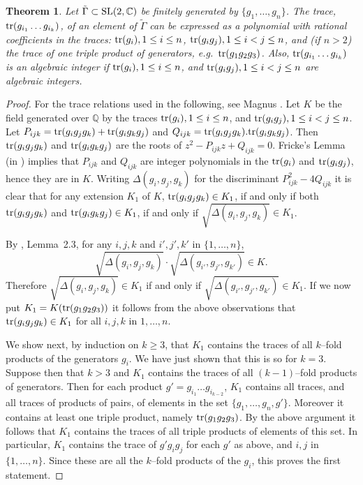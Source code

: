 \documentclass[a4paper]{amsart}
\def\Q{{\mathbb Q}}
\def\C{{\mathbb C}}
\def\sl2c{\mbox{\rm SL}(2,\C)}
\def\tr{\mbox{\rm tr}}
\def\Gammatil{\tilde{\Gamma}}
\newtheorem{theorem}{Theorem}[section]
\theoremstyle{definition}
\begin{document}
\begin{theorem} \label{genset}
Let $\Gammatil\subset\sl2c$ be finitely generated by $\{g_1,\ldots,g_n\}$.
The trace, $\tr(g_{i_1}\ldots g_{i_k})$, of an element of
$\Gammatil$ can be expressed as a
polynomial with rational coefficients in the traces: $\tr(g_i),
1\leq i \leq n$, $\tr(g_ig_j), 1\leq i < j\leq n$, and (if $n>2$) the
trace of one triple product of generators, e.g.\ $\tr(g_1g_2g_3)$.
Also, $\tr(g_{i_1}\ldots g_{i_k})$ is an algebraic integer if $\tr(g_i),
1\leq i \leq n$, and $\tr(g_ig_j), 1\leq i < j\leq n$ are algebraic integers. 
\end{theorem}

\begin{proof}
For the trace relations used in the following, see Magnus
\cite{magnus}. 
Let $K$ be the field generated over $\Q$ by the traces $\tr(g_i),
1\leq i \leq n$, and $\tr(g_ig_j), 1\leq i < j\leq n$. Let $P_{ijk} =
\tr(g_i g_j g_k) + \tr(g_i g_k g_j)$ and $Q_{ijk} = \tr(g_i g_j g_k) .
\tr(g_i g_k g_j)$. 
Then $\tr(g_i g_j g_k)$ and $\tr(g_i g_k g_j)$ are the roots of $z^2 -
P_{ijk} z + Q_{ijk} = 0$. 
Fricke's Lemma (in \cite{magnus}) implies that
$P_{ijk}$ and $Q_{ijk}$ are integer
polynomials in the $\tr(g_i)$ and $\tr(g_ig_j)$, hence
they are in $K$. 
Writing $\Delta(g_i,g_j,g_k)$ for the discriminant $P_{ijk}^2 - 4 Q_{ijk}$ it
is clear that for any extension $K_1$ of $K$,
$\tr(g_i g_j g_k) \in
K_1$, if and only if both $\tr(g_i g_j g_k)$ and $\tr(g_i g_k g_j)\in
K_1$, if and only if $\sqrt{\Delta(g_i,g_j,g_k)}\in K_1$. 

By \cite{magnus}, Lemma~2.3, for any $i,j,k$ and $i',j',k'$ in
$\{ 1,\ldots,n \}$, 
$$
\sqrt{\Delta(g_i,g_j,g_k)} \cdot \sqrt{\Delta(g_{i'},g_{j'},g_{k'})} \in K.
$$
Therefore $\sqrt{\Delta(g_i,g_j,g_k)} \in K_1$ if and only if
$\sqrt{\Delta(g_{i'},g_{j'},g_{k'})}\in K_1$. 
If we now put $K_1 = K(\tr(g_1g_2g_3))$ it follows from the above
observations that $\tr(g_i g_j g_k) \in K_1$ for all $i,j,k$ in
$1,\ldots,n$. 

We show next, by induction on $k\geq 3$, that $K_1$ contains the
traces of all $k$--fold products of the generators $g_i$. We have just
shown that this is so for $k=3$. Suppose then that $k>3$ and $K_1$
contains the traces of all $(k\!-\!1)$--fold products of generators. 
Then for each product
$g' = g_{i_1} \ldots g_{i_{k-2}}$, $K_1$ contains all traces, and
all traces of products of pairs, of elements
in the set $\{g_1,\ldots,g_n,g'\}$.
Moreover it contains at least one triple product, namely $\tr(g_1 g_2
g_3)$. By the above argument it follows that $K_1$ contains the traces
of all triple products of elements of this set. In particular, $K_1$
contains the trace of $g'g_i g_j$ for each $g'$ as above, and $i,j$ in
$\{ 1,\ldots,n \}$. Since these are all the $k$--fold products of the $g_i$,
this proves the first statement. 


\end{proof}
\end{document}
